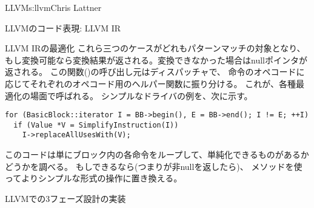 \begin{aosachapter}{LLVM}{s:llvm}{Chris Lattner}
\begin{aosasect1}{LLVMのコード表現: LLVM IR}
\begin{aosasect2}{LLVM IRの最適化}
これら三つのケースがどれもパターンマッチの対象となり、
もし変換可能なら変換結果が返される。変換できなかった場合はnullポインタが返される。
この関数()の呼び出し元はディスパッチャで、
命令のオペコードに応じてそれぞれのオペコード用のヘルパー関数に振り分ける。
これが、各種最適化の場面で呼ばれる。
シンプルなドライバの例を、次に示す。

\begin{verbatim}
for (BasicBlock::iterator I = BB->begin(), E = BB->end(); I != E; ++I)
  if (Value *V = SimplifyInstruction(I))
    I->replaceAllUsesWith(V);
\end{verbatim}

\noindent
このコードは単にブロック内の各命令をループして、単純化できるものがあるかどうかを調べる。
もしできるなら(つまりが非nullを返したら)、
メソッドを使ってよりシンプルな形式の操作に置き換える。

\end{aosasect2}

\end{aosasect1}

\begin{aosasect1}{LLVMでの3フェーズ設計の実装}


\end{aosasect1}
\end{aosachapter}
